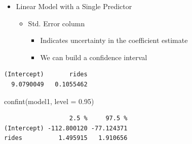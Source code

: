 \documentclass[
  ignorenonframetext,
]{beamer}
\newenvironment{Shaded}{\begin{snugshade}}{\end{snugshade}}
\newcommand{\AttributeTok}[1]{\textcolor[rgb]{0.40,0.45,0.13}{#1}}
\newcommand{\DecValTok}[1]{\textcolor[rgb]{0.68,0.00,0.00}{#1}}
\newcommand{\FloatTok}[1]{\textcolor[rgb]{0.68,0.00,0.00}{#1}}
\newcommand{\FunctionTok}[1]{\textcolor[rgb]{0.28,0.35,0.67}{#1}}
\newcommand{\NormalTok}[1]{\textcolor[rgb]{0.00,0.23,0.31}{#1}}
\newcommand{\SpecialCharTok}[1]{\textcolor[rgb]{0.37,0.37,0.37}{#1}}
\providecommand{\tightlist}{%
  \setlength{\itemsep}{0pt}\setlength{\parskip}{0pt}}\usepackage{longtable,booktabs,array}
\begin{document}
\begin{frame}[fragile]{}
\label{section-15}
\begin{itemize}
\item
  Linear Model with a Single Predictor

  \begin{itemize}
  \item
    Std. Error column

    \begin{itemize}
    \tightlist
    \item
      Indicates uncertainty in the coefficient estimate
    \item
      We can build a confidence interval
    \end{itemize}
  \end{itemize}
\end{itemize}

\tiny

\begin{Shaded}
\end{Shaded}

\begin{verbatim}
(Intercept)       rides 
  9.0790049   0.1055462 
\end{verbatim}

\begin{Shaded}
\begin{Highlighting}[]
\FunctionTok{confint}\NormalTok{(model1, }\AttributeTok{level =} \FloatTok{0.95}\NormalTok{)}
\end{Highlighting}
\end{Shaded}

\begin{verbatim}
                  2.5 %     97.5 %
(Intercept) -112.800120 -77.124371
rides          1.495915   1.910656
\end{verbatim}
\end{frame}
\end{document}
